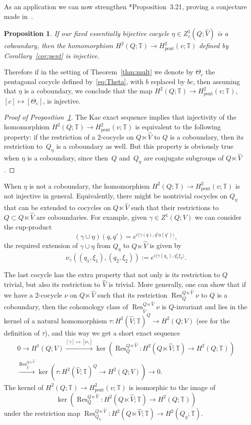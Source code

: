 \documentclass[a4paper,11pt,reqno]{amsart}
\numberwithin{equation}{section}
\newtheorem{proposition}[theorem]{Proposition}
\theoremstyle{remark}
\theoremstyle{definition}
\newcommand\bp{\begin{proof}}
\newcommand\ep{\end{proof}}
\newcommand\Res{\operatorname{Res}}
\newcommand\T{{\mathbb T}}
\newcommand\pent{\mathrm{pent}}
\begin{document}
As an application we can now strengthen \cite{GM}*{Proposition~3.21}, proving a conjecture made in~\cite{GM}.

\begin{proposition}\label{prop:inj}
If our fixed essentially bijective cocycle $\eta\in Z^1_c(Q;\hat V)$ is a coboundary, then the homomorphism $H^2(Q;\T)\to H^2_\pent(v;\T)$ defined by Corollary~\ref{cor:pent} is injective.
\end{proposition}

Therefore if in the setting of Theorem~\ref{thm:mult} we denote by $\Theta_c$ the pentagonal cocycle defined by~\eqref{eq:Theta}, with $b$ replaced by $bc$, then assuming that $\eta$ is a coboundary, we conclude that the map $H^2(Q;\T)\to H^2_\pent(v;\T)$, $[c]\mapsto[\Theta_c]$, is injective.

\bp[Proof of Proposition~\ref{prop:inj}]
The Kac exact sequence implies that injectivity of the homomorphism $H^2(Q;\T)\to H^2_\pent(v;\T)$ is equivalent to the following property: if the restriction of a $2$-cocycle on $Q\ltimes\hat V$ to $Q$ is a coboundary, then its restriction to~$Q_\eta$ is a coboundary as well. But this property is obviously true when $\eta$ is a coboundary, since then~$Q$ and~$Q_\eta$ are conjugate subgroups of $Q\ltimes\hat V$.
\ep

When $\eta$ is not a coboundary, the homomorphism $H^2(Q;\T)\to H^2_\pent(v;\T)$ is not injective in general. Equivalently, there might be nontrivial cocycles on $Q_\eta$ that can be extended to cocycles on $Q\ltimes\hat V$ such that their restrictions to $Q\subset Q\ltimes\hat V$ are coboundaries. For example, given $\gamma\in Z^1(Q;V)$ we can consider the cup-product
$$
(\gamma\cup\eta)(q,q')=e^{i\langle\gamma(q),q^\flat\eta(q')\rangle},
$$
the required extension of $\gamma\cup\eta$ from $Q_\eta$ to $Q\ltimes\hat V$ is given by
$$
\nu_\gamma((q_1,\xi_1),(q_2,\xi_2)):=e^{i\langle\gamma(q_1),q_1^\flat\xi_2\rangle}.
$$

The last cocycle has the extra property that not only is its restriction to $Q$ trivial, but also its restriction to $\hat V$ is trivial. More generally, one can show that if we have a $2$-cocycle $\nu$ on $Q\ltimes\hat V$ such that its restriction $\Res^{Q\ltimes\hat V}_Q\nu$ to $Q$ is a coboundary, then the cohomology class of $\Res^{Q\ltimes\hat V}_{\hat V}\nu$ is $Q$-invariant and lies in the kernel of a natural homomorphism $\tau\colon H^2(\hat V;\T)^Q\to H^2(Q;V)$ (see  for the definition of $\tau$), and this way we get a short exact sequence
\begin{multline*}
0\to H^1(Q;V)\xrightarrow{[\gamma]\mapsto[\nu_\gamma]}\ker(\Res^{Q\ltimes\hat V}_Q\colon H^2(Q\ltimes\hat V;\T)\to  H^2(Q;\T))\\
\xrightarrow{\Res^{Q\ltimes\hat V}_{\hat V}}\ker(\tau\colon H^2(\hat V;\T)^Q\to H^2(Q;V))\to0.
\end{multline*}
The kernel of $H^2(Q;\T)\to H^2_\pent(v;\T)$ is isomorphic to the image of
$$\ker(\Res^{Q\ltimes\hat V}_Q\colon H^2(Q\ltimes\hat V;\T)\to H^2(Q;\T))$$ under the restriction map $\Res^{Q\ltimes\hat V}_{Q_\eta}\colon H^2(Q\ltimes\hat V;\T)\to H^2(Q_\eta;\T)$.
\end{document}
